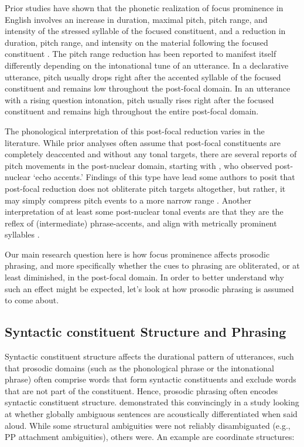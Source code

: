 \documentclass[preprint,review,12pt,authoryear,times]{elsarticle}
\begin{document}
Prior studies have shown that the  phonetic realization of focus prominence in English involves an increase in duration, maximal pitch, pitch range, and intensity of the stressed syllable of the focused constituent, and a reduction in duration, pitch range, and intensity on the material following the focused constituent \citep[][i.a.]{coope85, eady86, breenetal10}. The pitch range reduction has been reported to manifest itself differently depending on the intonational tune of an utterance. In a declarative utterance, pitch usually drops right after the accented syllable of the focused constituent and remains low throughout the post-focal domain. In an utterance with a rising question intonation, pitch usually rises right after the focused constituent and remains high throughout the entire post-focal domain. 

The phonological interpretation of this post-focal reduction varies in the literature. While prior analyses often assume that post-focal constituents are completely deaccented and without any tonal targets, there are several reports of pitch movements in the post-nuclear domain, starting with \citet[223]{pierr80}, who observed post-nuclear `echo accents.' Findings of this type  have lead some authors to posit that post-focal reduction does not obliterate pitch targets altogether, but rather, it may simply compress pitch events to a more narrow range \citep[e.g.][]{sugah03, ishih03, ishih16, kugle17}.  Another interpretation of at least some post-nuclear tonal events are that they are the reflex of (intermediate) phrase-accents, and align with metrically prominent syllables \citep[see][for a detailed discussion of phrase accents]{grice00}.

Our main research question here is how focus prominence affects prosodic phrasing, and more specifically whether the cues to phrasing are obliterated, or at least diminished, in the post-focal domain. In order to better understand why such an effect might be expected, let's look at how prosodic phrasing is assumed to come about. 


\subsection{Syntactic constituent Structure and Phrasing}

Syntactic constituent structure affects the durational pattern of utterances, such that prosodic domains (such as the phonological phrase or the intonational phrase) often comprise words that form syntactic constituents and exclude words that are not part of the constituent. Hence, prosodic phrasing often encodes syntactic constituent structure. \citet{lehis73} demonstrated this convincingly in a study looking at whether globally ambiguous sentences are acoustically differentiated when said aloud. While some structural ambiguities were not reliably disambiguated (e.g., PP attachment ambiguities), others were. An example are coordinate structures:
\end{document}
